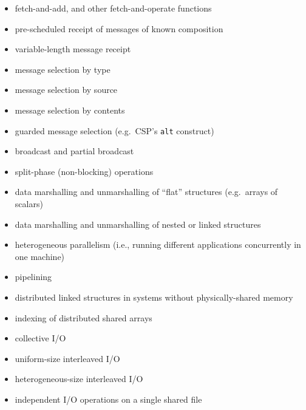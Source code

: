 \begin{itemize}
\item	fetch-and-add, and other fetch-and-operate functions
\item	pre-scheduled receipt of messages of known composition
\item	variable-length message receipt
\item	message selection by type
\item	message selection by source
\item	message selection by contents
\item	guarded message selection (e.g.\ CSP's {\tt{alt}} construct)
\item	broadcast and partial broadcast
\item	split-phase (non-blocking) operations
\item	data marshalling and unmarshalling of ``flat'' structures (e.g.\ arrays of scalars)
\item	data marshalling and unmarshalling of nested or linked structures
\item	heterogeneous parallelism (i.e., running different applications concurrently in one machine)
\item	pipelining
\item	distributed linked structures in systems without physically-shared memory
\item	indexing of distributed shared arrays
\item	collective I/O
\item	uniform-size interleaved I/O
\item	heterogeneous-size interleaved I/O
\item	independent I/O operations on a single shared file
\end{itemize}
